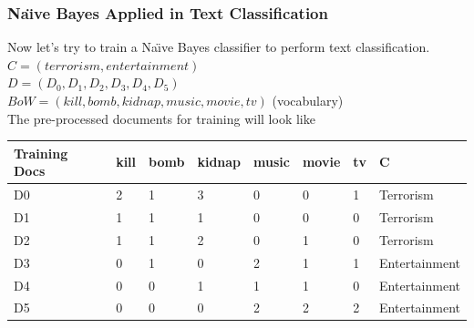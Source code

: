 \documentclass[serif,11pt,aspectratio=1610,table]{beamer}
\begin{document}
\begin{frame}[fragile]
 \frametitle{Na\"{\i}ve Bayes Applied in Text Classification}
Now let's try to train a Na\"{\i}ve Bayes classifier to perform text classification. \\

$C = (terrorism,entertainment)$ \\
$D = (D_{0},D_{1},D_{2},D_{3},D_{4},D_{5})$ \\
$ BoW = (kill,bomb,kidnap,music,movie,tv) $   (vocabulary) \\
\footnotesize 
The pre-processed documents for training will look like\\
\begin{tabular}{|l|l|l|l|l|l|l|l|}
  \hline
  Training Docs & kill & bomb & kidnap & music & movie & tv & C \\ \hline
  D0 & 2 & 1 & 3 & 0 & 0 & 1 & Terrorism \\ \hline
  D1 & 1 & 1 & 1 & 0 & 0 & 0 & Terrorism \\ \hline
  D2 & 1 & 1 & 2 & 0 & 1 & 0 & Terrorism \\ \hline
  D3 & 0 & 1 & 0 & 2 & 1 & 1 & Entertainment \\ \hline
  D4 & 0 & 0 & 1 & 1 & 1 & 0 & Entertainment \\ \hline
  D5 & 0 & 0 & 0 & 2 & 2 & 2 & Entertainment \\
  \hline
  \end{tabular}
\end{frame}
\end{document}
